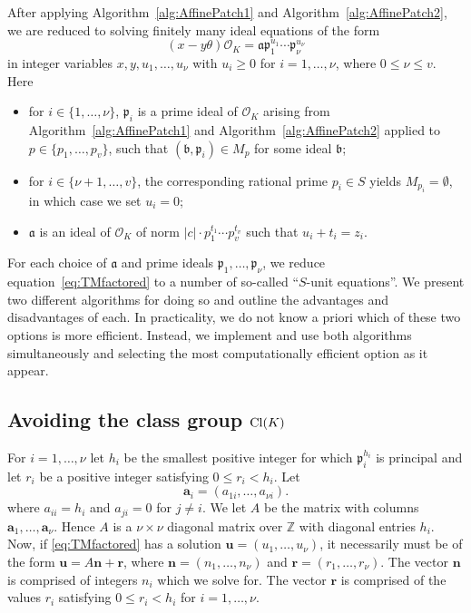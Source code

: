 After applying Algorithm~\ref{alg:AffinePatch1} and Algorithm~\ref{alg:AffinePatch2}, we are reduced to solving finitely many ideal equations of the form
\begin{equation}\label{eq:TMfactored}
(x-y\theta)\mathcal{O}_K=\mathfrak{a} \mathfrak{p}_1^{u_1}\cdots \mathfrak{p}_{\nu}^{u_{\nu}}
\end{equation}
in integer variables $x,y,u_1, \dots, u_{\nu}$ with $u_i \geq 0$ for $i = 1, \dots, \nu$, where ${0 \leq \nu \leq v}$. Here
\begin{itemize}
\item for $i \in \{1, \dots, \nu\}$, $\mathfrak{p}_i$ is a prime ideal of $\mathcal{O}_K$ arising from Algorithm~\ref{alg:AffinePatch1} and Algorithm~\ref{alg:AffinePatch2} applied to $p \in \{p_1, \dots, p_v\}$, such that $(\mathfrak{b}, \mathfrak{p}_i) \in M_p$ for some ideal $\mathfrak{b}$;
\item for $i \in \{\nu+1, \dots, v\}$, the corresponding rational prime $p_i \in S$ yields $M_{p_i} = \emptyset$, in which case we set $u_i = 0$;
\item $\mathfrak{a}$ is an ideal of $\mathcal{O}_K$ of norm $|c|\cdot p_1^{t_1} \cdots p_v^{t_v}$ such that
$u_i + t_i =  z_i$. 
\end{itemize}

For each choice of $\mathfrak{a}$ and prime ideals $\mathfrak{p}_1, \dots, \mathfrak{p}_{\nu}$, we reduce equation~\eqref{eq:TMfactored} to a number of so-called ``$S$-unit equations''. We present two different algorithms for doing so and outline the advantages and disadvantages of each. In practicality, we do not know a priori which of these two options is more efficient. Instead, we implement and use both algorithms simultaneously and selecting the most computationally efficient option as it appear. 


\subsection{Avoiding the class group $\operatorname{Cl}(K)$}
\label{subsec:FactorizationTMwithoutOK}

For $i = 1, \dots, {\nu}$ let $h_i$ be the smallest positive integer for which $\mathfrak{p}_i^{h_i}$ is principal and let 
$r_i$ be a positive integer satisfying $0 \leq r_i < h_i$. Let
\[\mathbf{a}_i = (a_{1i}, \dots, a_{{\nu}i}).\]
where $a_{ii} = h_i$ and $a_{ji} = 0$ for $j \neq i$. We let $A$ be the matrix with columns $\mathbf{a}_1, \dots, \mathbf{a}_{\nu}$. Hence $A$ is a $\nu \times \nu$ diagonal matrix over $\mathbb{Z}$ with diagonal entries $h_i$. Now, if \eqref{eq:TMfactored} has a solution $\mathbf{u} = (u_1, \dots, u_{\nu})$, it necessarily must be of the form $\mathbf{u} = A\mathbf{n} + \mathbf{r}$, where $\mathbf{n} = (n_1, \dots, n_{\nu})$ and $\mathbf{r} = (r_1, \dots, r_{\nu})$. The vector $\mathbf{n}$ is comprised of integers $n_i$ which we solve for. The vector $\mathbf{r}$ is comprised of the values $r_i$ satisfying $0 \leq r_i < h_i$ for $i = 1, \dots, \nu$. 

